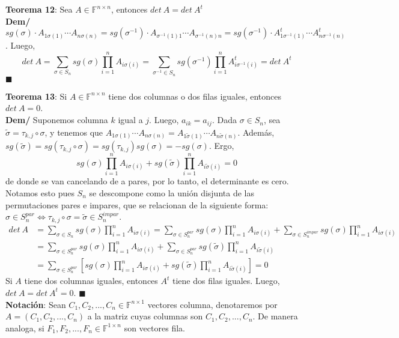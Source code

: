 \documentclass[11pt,a4paper]{article}
\newcommand*{\QEDA}{\null\nobreak\hfill\ensuremath{\blacksquare}}
\begin{document}
\textbf{Teorema 12}: Sea $A \in \mathbb{F}^{n \times n}$, entonces $det\ A = det\ A^t$\\
\textbf{Dem/} $sg(\sigma) \cdot A_{1\sigma(1)}\cdots A_{n\sigma(n)} = sg(\sigma^{-1}) \cdot A_{\sigma^{-1}(1)1}\cdots A_{\sigma^{-1}(n)n} = sg(\sigma^{-1}) \cdot A^t_{1\sigma^{-1}(1)}\cdots A^t_{n\sigma^{-1}(n)}$. Luego, 
$$det\ A = \sum_{\sigma \in S_n} sg(\sigma) \prod_{i = 1}^n A_{i \sigma(i)} = \sum_{\sigma^{-1} \in S_n} sg(\sigma^{-1}) \prod_{i = 1}^n A^t_{i \sigma^{-1}(i)} = det\ A^t$$ \QEDA 

\newpage

\textbf{Teorema 13}: Si $A \in \mathbb{F}^{n \times n}$ tiene dos columnas o dos filas iguales, entonces $det\ A = 0$. \\
\textbf{Dem/} Suponemos columna $k$ igual a $j$. Luego, $a_{ik} = a_{ij}$. Dada $\sigma \in S_n$, sea $\tilde{\sigma} = \tau_{k,j} \circ \sigma$, y tenemos que $A_{1\sigma(1)} \cdots A_{n\sigma(n)} = A_{1\tilde{\sigma}(1)} \cdots A_{n\tilde{\sigma}(n)}$. Adem\'as, $sg(\tilde{\sigma}) = sg(\tau_{k,j} \circ \sigma) = sg(\tau_{k,j})sg(\sigma) = - sg(\sigma)$. Ergo, $$sg(\sigma) \prod_{i=1}^n A_{i\sigma(i)} + sg(\tilde{\sigma}) \prod_{i=1}^n A_{i\tilde{\sigma}(i)} = 0$$
de donde se van cancelando de a pares, por lo tanto, el determinante es cero. Notamos esto pues $S_n$ se descompone como la uni\'on disjunta de las permutaciones pares e impares, que se relacionan de la siguiente forma: $\sigma \in S_n^{par} \iff \tau_{k,j} \circ \sigma = \tilde{\sigma} \in S_n^{impar}$. 
\begin{align*}
det\ A 
&= \sum_{\sigma \in S_n} sg(\sigma) \prod_{i=1}^n A_{i\sigma(i)}
= \sum_{\sigma \in S_n^{par}} sg(\sigma) \prod_{i=1}^n A_{i\sigma(i)} + \sum_{\sigma \in S_n^{impar}} sg(\sigma) \prod_{i=1}^n A_{i\sigma(i)}\\
&= \sum_{\sigma \in S_n^{par}} sg(\sigma) \prod_{i=1}^n A_{i\sigma(i)} + \sum_{\sigma \in S_n^{par}} sg(\tilde{\sigma}) \prod_{i=1}^n A_{i\tilde\sigma(i)}\\
&= \sum_{\sigma \in S_n^{par}} \left[ sg(\sigma) \prod_{i=1}^n A_{i\sigma(i)} + sg(\tilde{\sigma}) \prod_{i=1}^n A_{i\tilde\sigma(i)} \right] = 0
\end{align*}
Si $A$ tiene dos columnas iguales, entonces $A^t$ tiene dos filas iguales. Luego, $det\ A = det\ A^t = 0$. \QEDA\\

\textbf{Notaci\'on}: Sean $C_1, C_2, ..., C_n \in \mathbb{F}^{n \times 1}$ vectores columna, denotaremos por $A = (C_1, C_2, ..., C_n)$ a la matriz cuyas columnas son $C_1, C_2, ..., C_n$. De manera analoga, si $F_1, F_2, ..., F_n \in \mathbb{F}^{1 \times n}$ son vectores fila.\\
\end{document}
